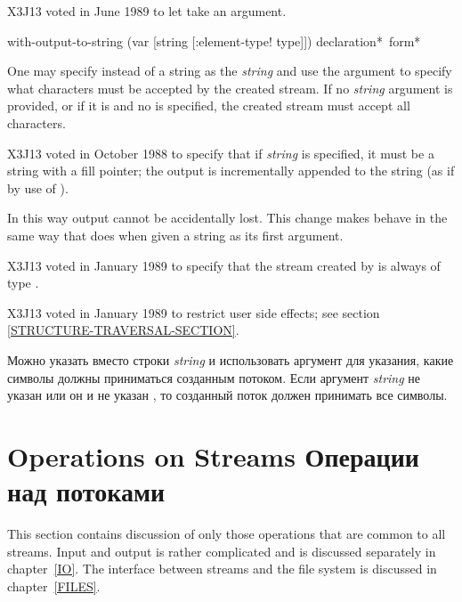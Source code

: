 \begin{newer}
X3J13 voted in June 1989 
to let  take an  argument.

\begin{defmac}
with-output-to-string (var [string [\!:element-type! type]])
                      {declaration}* {\,form}*

One may specify  instead of a string as the \emph{string}
and use the  argument to specify what characters
must be accepted by the created stream.  If no \emph{string} argument
is provided, or if it is  and no  is specified,
the created stream must accept all characters.

X3J13 voted in October 1988
to specify that
if \emph{string} is specified, it must be a string with a fill pointer;
the output is incrementally appended to the string (as if by use of
).

In this way output cannot be accidentally lost.  This change makes
 behave in the same way that  does
when given a string as its first argument.

X3J13 voted in January 1989
to specify that the stream created by
 is always of type .

X3J13 voted in January 1989
to restrict user side effects; see section \ref{STRUCTURE-TRAVERSAL-SECTION}.

Можно указать  вместо строки \emph{string} и использовать аргумент
 для указания, какие символы должны приниматься созданным
потоком. Если аргумент \emph{string} не указан или он  и не указан
, то созданный поток должен принимать все символы.
\end{defmac}
\end{newer}

\section {Operations on Streams Операции над потоками}

This section contains discussion of only those operations that
are common to all streams.  Input and output is rather complicated
and is discussed separately in chapter~\ref{IO}.
The interface between streams and the file system is discussed
in chapter~\ref{FILES}.

